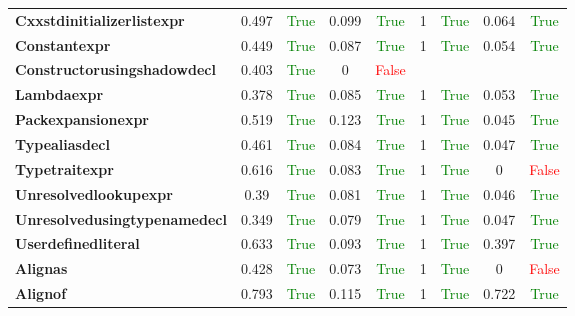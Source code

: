 \documentclass{article}
\begin{document}
\begin{xltabular}{\textwidth}{lcccccccc}
\textbf{{\fontsize{10}{12}\selectfont Cxxstdinitializerlistexpr}}& 0.497&\textcolor{green}{True}& 0.099&\textcolor{green}{True}& 1&\textcolor{green}{True}& 0.064&\textcolor{green}{True} \\[0.5ex]
\textbf{{\fontsize{10}{12}\selectfont Constantexpr}}& 0.449&\textcolor{green}{True}& 0.087&\textcolor{green}{True}& 1&\textcolor{green}{True}& 0.054&\textcolor{green}{True} \\[0.5ex]
\textbf{{\fontsize{10}{12}\selectfont Constructorusingshadowdecl}}& 0.403&\textcolor{green}{True}& 0&\textcolor{red}{False} \\[0.5ex]
\textbf{{\fontsize{10}{12}\selectfont Lambdaexpr}}& 0.378&\textcolor{green}{True}& 0.085&\textcolor{green}{True}& 1&\textcolor{green}{True}& 0.053&\textcolor{green}{True} \\[0.5ex]
\textbf{{\fontsize{10}{12}\selectfont Packexpansionexpr}}& 0.519&\textcolor{green}{True}& 0.123&\textcolor{green}{True}& 1&\textcolor{green}{True}& 0.045&\textcolor{green}{True} \\[0.5ex]
\textbf{{\fontsize{10}{12}\selectfont Typealiasdecl}}& 0.461&\textcolor{green}{True}& 0.084&\textcolor{green}{True}& 1&\textcolor{green}{True}& 0.047&\textcolor{green}{True} \\[0.5ex]
\textbf{{\fontsize{10}{12}\selectfont Typetraitexpr}}& 0.616&\textcolor{green}{True}& 0.083&\textcolor{green}{True}& 1&\textcolor{green}{True}& 0&\textcolor{red}{False} \\[0.5ex]
\textbf{{\fontsize{10}{12}\selectfont Unresolvedlookupexpr}}& 0.39&\textcolor{green}{True}& 0.081&\textcolor{green}{True}& 1&\textcolor{green}{True}& 0.046&\textcolor{green}{True} \\[0.5ex]
\textbf{{\fontsize{10}{12}\selectfont Unresolvedusingtypenamedecl}}& 0.349&\textcolor{green}{True}& 0.079&\textcolor{green}{True}& 1&\textcolor{green}{True}& 0.047&\textcolor{green}{True} \\[0.5ex]
\textbf{{\fontsize{10}{12}\selectfont Userdefinedliteral}}& 0.633&\textcolor{green}{True}& 0.093&\textcolor{green}{True}& 1&\textcolor{green}{True}& 0.397&\textcolor{green}{True} \\[0.5ex]
\textbf{{\fontsize{10}{12}\selectfont Alignas}}& 0.428&\textcolor{green}{True}& 0.073&\textcolor{green}{True}& 1&\textcolor{green}{True}& 0&\textcolor{red}{False} \\[0.5ex]
\textbf{{\fontsize{10}{12}\selectfont Alignof}}& 0.793&\textcolor{green}{True}& 0.115&\textcolor{green}{True}& 1&\textcolor{green}{True}& 0.722&\textcolor{green}{True} \\[0.5ex]

\end{xltabular}
\end{document}
